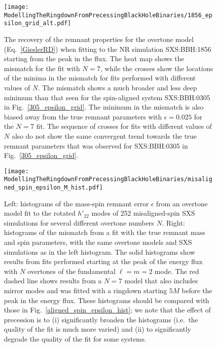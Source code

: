 \begin{figure}[t]
    \centering
    \texttt{[image: ModellingTheRingdownFromPrecessingBlackHoleBinaries/1856\_epsilon\_grid\_alt.pdf]}
    \caption[Recovery of the SXS:BBH:1856 remnant properties using an overtone model starting from the peak of the GW energy flux]{
    The recovery of the remnant properties for the overtone model (Eq.~\ref{GieslerRD}) when fitting to the NR simulation SXS:BBH:1856 starting from the peak in the flux.
    The heat map shows the mismatch for the fit with $N=7$, while the crosses show the locations of the minima in the mismatch for fits performed with different values of $N$.
    The mismatch shows a much broader and less deep minimum than that seen for the spin-aligned system SXS:BBH:0305 in Fig.~\ref{305_epsilon_grid}.
    The minimum in the mismatch is also biased away from the true remnant parameters with $\epsilon=0.025$ for the $N=7$ fit.
    The sequence of crosses for fits with different values of $N$ also do not show the same convergent trend towards the true remnant parameters that was observed for SXS:BBH:0305 in Fig.~\ref{305_epsilon_grid}.
	}
	\label{1856_epsilon_grid}
\end{figure}

\begin{figure}[t]
    \centering
    \texttt{[image: ModellingTheRingdownFromPrecessingBlackHoleBinaries/misaligned\_spin\_epsilon\_M\_hist.pdf]}
    \caption[Remnant error and mismatches for fits to misaligned-spin SXS simulations using an overtone model]{Left: histograms of the mass-spin remnant error $\epsilon$ from an overtone model fit to the rotated $h'_{22}$ modes of 252 misaligned-spin SXS simulations for several different overtone numbers $N$. 
    Right: histograms of the mismatch from a fit with the true remnant mass and spin parameters, with the same overtone models and SXS simulations as in the left histogram.
    The solid histograms show results from fits performed starting at the peak of the energy flux with $N$ overtones of the fundamental $\ell = m = 2$ mode.
    The red dashed line shows results from a $N=7$ model that also includes mirror modes and was fitted with a ringdown starting $5M$ before the peak in the energy flux.
    These histograms should be compared with those in Fig.~\ref{aligned_spin_epsilon_hist}; we note that the effect of precession is to (i) significantly broaden the histograms (i.e.\ the quality of the fit is much more varied) and (ii) to significantly degrade the quality of the fit for some systems.}
    \label{misaligned_spin_epsilon_hist}
\end{figure}

